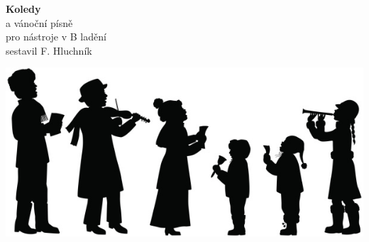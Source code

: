 \vspace*{100pt}
\begin{center}
\fontsize{50}{60}\selectfont
\textbf{Koledy}\\
\vspace*{20pt}
\fontsize{30}{40}\selectfont
a vánoční písně\\
\vspace*{30pt}
\fontsize{15}{20}\selectfont
pro nástroje v B ladění\\
\vspace*{\fill}
\fontsize{12}{20}\selectfont
sestavil F. Hluchník

\vspace*{\fill}
\hspace{-50pt}\includegraphics[scale=3]{musicians.jpg}
\end{center}
\newpage